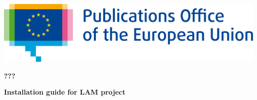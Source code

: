 

\newcommand{\placetextbox}[3]{%
	\setbox0=\hbox{#3}%
	\AddToShipoutPictureFG*{%
		\put(\LenToUnit{#1\paperwidth},\LenToUnit{#2\paperheight}){\vtop{{\null}\makebox[0pt][c]{#3}}}%
	}%
}%

\newcommand{\DelTitle}{Installation guide for LAM project}
\newcommand{\DelNumber}{WP 1.3.8}
\newcommand{\DelVersion}{1.0}
\newcommand{\DelCorporateAuthor}{???}
\newcommand{\DelAuthor}{Eugeniu Costetchi}
\newcommand{\DelReviewer}{???}
\newcommand{\DelDate}{???}
\newcommand{\DelInitiative}{???}
\newcommand{\DelPreparation}{???}
\newcommand{\DelReaders}{???}
\newcommand{\DelCopyright}{\textsuperscript{\textcopyright} European Union, 2021 }


\pagestyle{empty}


\begin{titlepage}
	\begin{center}

		\begin{center}
			\begin{center}
				\setlength{\tabcolsep}{0pt}
				\includegraphics[width=0.35\linewidth]{images/logos/EU-OP.png}
			\end{center}


			\vspace{2mm}

		\end{center}
		\vspace{5cm}
		\textbf{{\large \DelInitiative\\}}
		\vspace{2cm}

		\begin{spacing}{2.5}
			\textbf{\Huge \DelTitle}\\ \vspace{2cm}
		\end{spacing}

		\vspace*{\fill}


	\end{center}
\end{titlepage}

